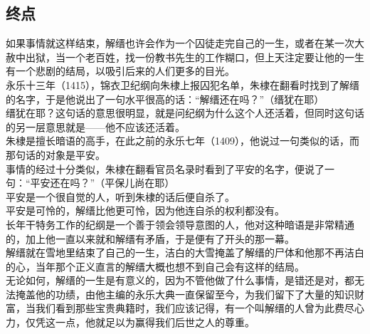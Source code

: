 \begin{multicols}{\theparacolNo}
\subsection{终点}
如果事情就这样结束，解缙也许会作为一个囚徒走完自己的一生，或者在某一次大赦中出狱，当一个老百姓，找一份教书先生的工作糊口，但上天注定要让他的一生有一个悲剧的结局，以吸引后来的人们更多的目光。\\

永乐十三年（1415），锦衣卫纪纲向朱棣上报囚犯名单，朱棣在翻看时找到了解缙的名字，于是他说出了一句水平很高的话：“解缙还在吗？”（缙犹在耶）\\

缙犹在耶？这句话的意思很明显，就是问纪纲为什么这个人还活着，但同时这句话的另一层意思就是——他不应该还活着。\\

朱棣是擅长暗语的高手，在此之前的永乐七年（1409），他说过一句类似的话，而那句话的对象是平安。\\

事情的经过十分类似，朱棣在翻看官员名录时看到了平安的名字，便说了一句：“平安还在吗？”（平保儿尚在耶）\\

平安是一个很自觉的人，听到朱棣的话后便自杀了。\\

平安是可怜的，解缙比他更可怜，因为他连自杀的权利都没有。\\

长年干特务工作的纪纲是一个善于领会领导意图的人，他对这种暗语是非常精通的，加上他一直以来就和解缙有矛盾，于是便有了开头的那一幕。\\

解缙就在雪地里结束了自己的一生，洁白的大雪掩盖了解缙的尸体和他那不再洁白的心，当年那个正义直言的解缙大概也想不到自己会有这样的结局。\\

无论如何，解缙的一生是有意义的，因为不管他做了什么事情，是错还是对，都无法掩盖他的功绩，由他主编的永乐大典一直保留至今，为我们留下了大量的知识财富，当我们看到那些宝贵典籍时，我们应该记得，有一个叫解缙的人曾为此费尽心力，仅凭这一点，他就足以为赢得我们后世之人的尊重。\\
\ifnum{}
	\end{multicols}
\fi
\newpage
